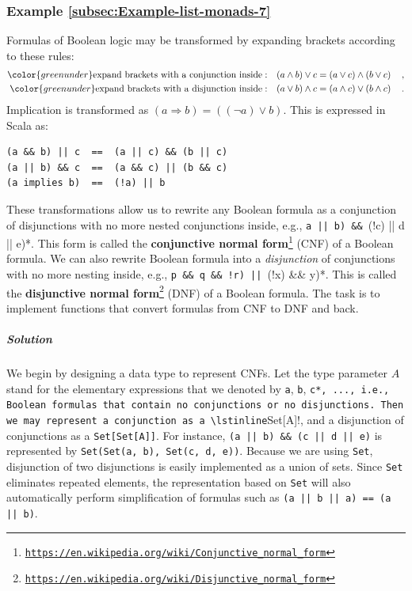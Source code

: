 \subsubsection{Example \label{subsec:Example-list-monads-7}\ref{subsec:Example-list-monads-7}}

Formulas of Boolean logic may be transformed by expanding brackets
according to these rules:
\begin{align*}
{\color{greenunder}\text{expand brackets with a conjunction inside}:}\quad & (a\wedge b)\vee c=\left(a\vee c\right)\wedge\left(b\vee c\right)\quad,\\
{\color{greenunder}\text{expand brackets with a disjunction inside}:}\quad & (a\vee b)\wedge c=\left(a\wedge c\right)\vee\left(b\wedge c\right)\quad.
\end{align*}
Implication is transformed as $(a\Rightarrow b)=((\neg a)\vee b)$.
This is expressed in Scala as:
\begin{lstlisting}
(a && b) || c  ==  (a || c) && (b || c)
(a || b) && c  ==  (a && c) || (b && c)
(a implies b)  ==  (!a) || b
\end{lstlisting}

\noindent These transformations allow us to rewrite any Boolean formula
as a conjunction of disjunctions with no more nested conjunctions
inside, e.g., \lstinline*(a || b) && ((!c) || d || e)*. This form
is called the \textbf{conjunctive normal form}\footnote{\texttt{\href{https://en.wikipedia.org/wiki/Conjunctive_normal_form}{https://en.wikipedia.org/wiki/Conjunctive\_normal\_form}}}
(CNF) of a Boolean formula. We can also rewrite Boolean formula into
a \emph{disjunction} of conjunctions with no more nesting inside,
e.g., \lstinline*(p && q && !r) || ((!x) && y)*. This is called the
\textbf{disjunctive normal form}\footnote{\texttt{\href{https://en.wikipedia.org/wiki/Disjunctive_normal_form}{https://en.wikipedia.org/wiki/Disjunctive\_normal\_form}}}
(DNF) of a Boolean formula. The task is to implement functions that
convert formulas from CNF to DNF and back. 

\subparagraph{Solution}

We begin by designing a data type to represent CNFs. Let the type
parameter $A$ stand for the elementary expressions that we denoted
by \lstinline!a!, \lstinline!b!, \lstinline*!c*, ..., i.e., Boolean
formulas that contain no conjunctions or no disjunctions. Then we
may represent a conjunction as a \lstinline!Set[A]!, and a disjunction
of conjunctions as a \lstinline!Set[Set[A]]!. For instance, \lstinline!(a || b) && (c || d || e)!
is represented by \lstinline!Set(Set(a, b), Set(c, d, e))!. Because
we are using \lstinline!Set!, disjunction of two disjunctions is
easily implemented as a union of sets. Since \lstinline!Set! eliminates
repeated elements, the representation based on \lstinline!Set! will
also automatically perform simplification of formulas such as \lstinline!(a || b || a) == (a || b)!.

